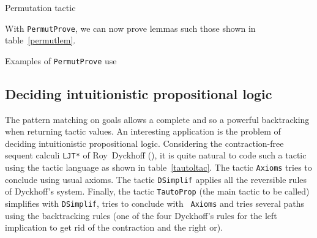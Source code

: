 \begin{table}[p]
\noindent{}
\caption{Permutation tactic}
\label{permutltac}
\end{table}

With {\tt PermutProve}, we can now prove lemmas such those shown in
table~\ref{permutlem}.

\begin{table}[p]
\noindent{}
\caption{Examples of {\tt PermutProve} use}
\label{permutlem}
\end{table}

\subsection{Deciding intuitionistic propositional logic}

The pattern matching on goals allows a complete and so a powerful
backtracking when returning tactic values. An interesting application
is the problem of deciding intuitionistic propositional
logic. Considering the contraction-free sequent calculi {\tt LJT*} of
Roy~Dyckhoff (\cite{Dyc92}), it is quite natural to code such a tactic
using the tactic language as shown in table~\ref{tautoltac}. The
tactic {\tt Axioms} tries to conclude using usual axioms. The tactic
{\tt DSimplif} applies all the reversible rules of Dyckhoff's
system. Finally, the tactic {\tt TautoProp} (the main tactic to be
called) simplifies with {\tt DSimplif}, tries to conclude with {\tt
Axioms} and tries several paths using the backtracking rules (one of
the four Dyckhoff's rules for the left implication to get rid of the
contraction and the right or).


